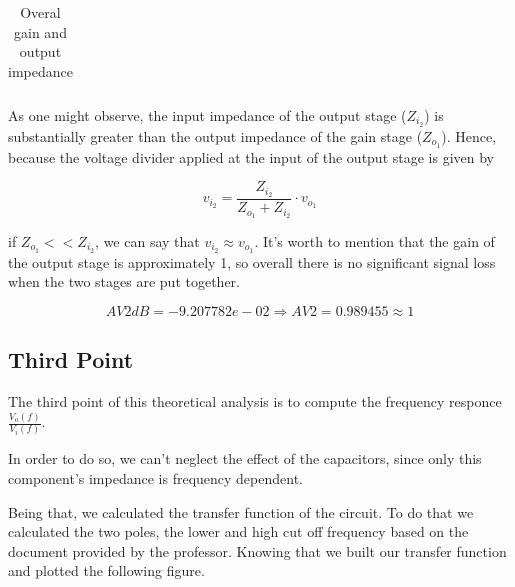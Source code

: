 \begin{table}[H]
	\centering
	\begin{tabularx}{0.9\textwidth} {
 	    | >{\raggedright\arraybackslash}X
  	    | >{\raggedleft\arraybackslash}X | }
	\hline
	
	\end{tabularx}
	\caption{Overal gain and output impedance}
	\label{tab:overall}
\end{table}
\vspace{5mm}

\par As one might observe, the input impedance of the output stage ($Z_{i_2}$) is substantially greater than the output impedance of the gain stage ($Z_{o_1}$). Hence, because the voltage divider applied at the input of the output stage is given by

\begin{equation}
	v_{i_2}= \frac{Z_{i_2}}{Z_{o_1}+Z_{i_2}} \cdot v_{o_1}
\end{equation}

\noindent if $Z_{o_1}<<Z_{i_2}$, we can say that $v_{i_2} \approx v_{o_1}$. It's worth to mention that the gain of the output stage is approximately 1, so overall there is no significant signal loss when the two stages are put together.

\begin{equation}
	AV2dB = -9.207782e-02 \Rightarrow AV2 = 0.989455 \approx 1
\end{equation}

\subsection{Third Point}

\par The third point of this theoretical analysis is to compute the frequency responce $\frac{V_o(f)}{V_i(f)}$. 
\par In order to do so, we can't neglect the effect of the capacitors, since only this component's impedance is frequency dependent.
\par Being that, we calculated the transfer function of the circuit. To do that we calculated the two poles, the lower and high cut off frequency based on the document provided by the professor. Knowing that we built our transfer function and plotted the following figure.


